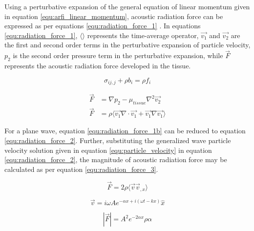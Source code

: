 			Using a perturbative expansion of the general equation of linear momentum given in equation \ref{equ:arfi_linear_momentum}, acoustic radiation force can be expressed as per equations \ref{equ:radiation_force_1} \cite{nyborg65}. In equations \ref{equ:radiation_force_1}, $\langle\rangle$ represents the time-average operator, $\vec{v_1}$ and $\vec{v_2}$ are the first and second order terms in the perturbative expansion of particle velocity, $p_2$ is the second order pressure term in the perturbative expansion, while $\vec{F}$ represents the acoustic radiation force developed in the tissue.

			\begin{equation}
				\label{equ:arfi_linear_momentum}
				\sigma_{ij,j} + \rho b_i = \rho f_i
			\end{equation}

			\begin{subequations}
				\label{equ:radiation_force_1}
				\begin{align}
					\vec{F} &= \nabla p_2 - \mu_{tissue} \nabla^2 \vec{v_2} \label{equ:radiation_force_1a} \\
					\vec{F} &= \rho \langle\vec{v_1}\nabla\cdot\vec{v_1} + \vec{v_1}\nabla\vec{v_1}\rangle \label{equ:radiation_force_1b}
				\end{align}
			\end{subequations}

			For a plane wave, equation \ref{equ:radiation_force_1b} can be reduced to equation \ref{equ:radiation_force_2}. Further, substituting the generalized wave particle velocity solution given in equation \ref{equ:particle_velocity} in equation \ref{equ:radiation_force_2}, the magnitude of acoustic radiation force may be calculated as per equation \ref{equ:radiation_force_3}.

			\begin{equation}
				\label{equ:radiation_force_2}
				\vec{F} = 2\rho\langle \vec{v} \vec{v}_{,x} \rangle
			\end{equation}

			\begin{equation}
				\label{equ:particle_velocity}
				\vec{v} = i\omega A e^{-\alpha x + i\left(\omega t - k x\right)}\hat{x}
			\end{equation}

			\begin{equation}
				\label{equ:radiation_force_3}
				\left|\vec{F}\right| = A^2 e^{-2\alpha x}\rho\alpha
			\end{equation}

